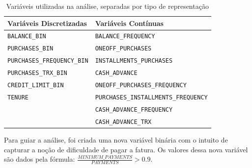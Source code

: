 \documentclass[12pt]{article}
\begin{document}


\begin{table}[h]
\centering
\caption{Variáveis utilizadas na análise, separadas por tipo de representação}
\resizebox{\textwidth}{!}
{\tiny
\begin{tabular}{|p{4cm}|p{4cm}|}
\hline
\textbf{Variáveis Discretizadas} & \textbf{Variáveis Contínuas} \\
\hline
\texttt{BALANCE\_BIN} & \texttt{BALANCE\_FREQUENCY} \\
\texttt{PURCHASES\_BIN} & \texttt{ONEOFF\_PURCHASES} \\
\texttt{PURCHASES\_FREQUENCY\_BIN} & \texttt{INSTALLMENTS\_PURCHASES} \\
\texttt{PURCHASES\_TRX\_BIN} & \texttt{CASH\_ADVANCE} \\
\texttt{CREDIT\_LIMIT\_BIN} & \texttt{ONEOFF\_PURCHASES\_FREQUENCY} \\
\texttt{TENURE}\footnotemark & \texttt{PURCHASES\_INSTALLMENTS\_FREQUENCY} \\
 & \texttt{CASH\_ADVANCE\_FREQUENCY} \\
 & \texttt{CASH\_ADVANCE\_TRX} \\
\hline
\end{tabular}
}
\label{tab:variaveis_tipo}
\end{table}


Para guiar a análise, foi criada uma nova variável binária com o intuito de capturar a noção de dificuldade de pagar a fatura. Os valores dessa nova variável são dados pela fórmula: $\frac{MINIMUM\_PAYMENTS}{PAYMENTS} > 0.9$.
\end{document}
